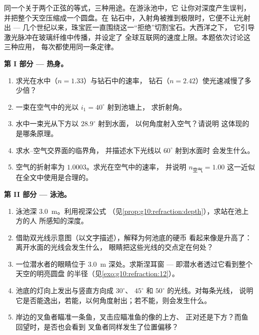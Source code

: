 \begin{problem}
\label{pb:g10:refraction:1}
同一个关于两个正弦的等式，三种用途。在游泳池中，它
让你对深度产生误判，并把整个天空压缩成一个圆盘。在
钻石中，入射角被推到极限时，它便不让光射出 ---
几个世纪以来，珠宝匠一直围绕这一“拒绝”切割宝石。大西洋之下，
它引导激光脉冲在玻璃纤维中传播，并设定了
全球互联网的速度上限。本题依次讨论这三种应用，
每次都使用同一条定律。

\medskip
\noindent\textbf{第 I 部分 --- 热身。}
\begin{enumerate}
  \item 求光在水中（$n = 1.33$）与钻石中的速率，
        钻石（$n = 2.42$）使光速减慢了多少倍？
  \item 一束在空气中的光以 $i_1 = 40^\circ$ 射到池塘上，
        求折射角。
  \item 水中一束光从下方以 $28.9^\circ$ 射到水面，
        以何角度射入空气？请说明
        这体现的是哪条原理。
  \item 求水--空气交界面的临界角，
        并描述水下光线以 $60^\circ$ 射到水面时
        会发生什么。
  \item 空气的折射率为 $1.0003$。求光在空气中的速率，
        并说明 $n_{\text{空气}} = 1.00$ 这一近似
        在全文中使用是合理的。
\end{enumerate}

\medskip
\noindent\textbf{第 II 部分 --- 泳池。}
\begin{enumerate}[resume]
  \item 泳池深 \qty{3.0}{m}。利用视深公式
        （见\cref{prop:g10:refraction:depth}），求站在池上方的人
        所感知的深度。
  \item 借助双光线示意图（以文字描述），解释为何池底的硬币
        看起来像是升高了：离开水面的光线会发生什么，
        眼睛把这些光线的交点定在何处？
  \item 一位潜水者的眼睛位于 \qty{3.0}{m} 深处。求斯涅耳窗 ---
        即潜水者透过它看到整个天空的明亮圆盘
        的半径（见\cref{exo:g10:refraction:12}）。
  \item 池底的灯向上发出与竖直方向成 $30^\circ$、
        $45^\circ$ 和 $50^\circ$ 的光线。对每条光线，
        说明它是否能逸出，若能，以何角度射出；若不能，则会发生什么。
  \item 岸边的叉鱼者瞄准一条鱼，叉击应瞄准鱼的像的上方、
        正对还是下方？而鱼回望时，是否也会看到
        叉鱼者同样发生了位置偏移？
\end{enumerate}


\end{problem}
